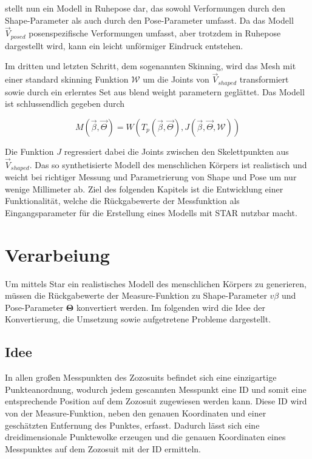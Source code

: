 stellt nun ein Modell in Ruhepose dar, das sowohl Verformungen durch den Shape-Parameter als auch durch den
Pose-Parameter umfasst. Da das Modell $\vec{V}_{posed}$ posenspezifische Verformungen umfasst, aber trotzdem in Ruhepose dargestellt
wird, kann ein leicht unförmiger Eindruck entstehen. 

Im dritten und letzten Schritt, dem sogenannten Skinning, wird das Mesh mit einer standard skinning Funktion $\mathcal{W}$  um die Joints von $\vec{V}_{shaped}$ transformiert sowie durch ein erlerntes Set aus blend weight parametern geglättet. Das Modell ist schlussendlich gegeben durch

\begin{equation}\label{eq:Star_Model}
  M(\vec{\beta},\vec{\Theta})=W(T_p(\vec{\beta},\vec{\Theta}), J(\vec{\beta},\vec{\Theta}, \mathcal{W}))
\end{equation}

Die Funktion $J$ regressiert dabei die Joints zwischen den Skelettpunkten aus $\vec{V}_{shaped}$. Das so synthetisierte Modell des
menschlichen Körpers ist realistisch und weicht bei richtiger Messung und Parametrierung von Shape und Pose um nur wenige
Millimeter ab. Ziel des folgenden Kapitels ist die Entwicklung einer Funktionalität, welche die Rückgabewerte der
Messfunktion als Eingangsparameter für die Erstellung eines Modells mit STAR nutzbar macht.

\section{Verarbeiung}

Um mittels Star ein realistisches Modell des menschlichen Körpers zu generieren, müssen die Rückgabewerte der
Measure-Funktion zu Shape-Parameter $v{\beta}$ und Pose-Parameter $\boldsymbol{\Theta}$ konvertiert werden. Im folgenden wird die Idee der Konvertierung, die Umsetzung sowie aufgetretene
Probleme dargestellt.

\subsection{Idee}

In allen großen Messpunkten des Zozosuits befindet sich eine einzigartige Punkteanordnung, wodurch jedem gescannten
Messpunkt eine ID und somit eine entsprechende Position auf dem Zozosuit zugewiesen werden kann. Diese ID wird von der Measure-Funktion, neben den genauen Koordinaten und einer geschätzten Entfernung des
Punktes, erfasst. Dadurch lässt sich eine dreidimensionale Punktewolke erzeugen und die genauen Koordinaten eines
Messpunktes auf dem Zozosuit mit der ID ermitteln.

